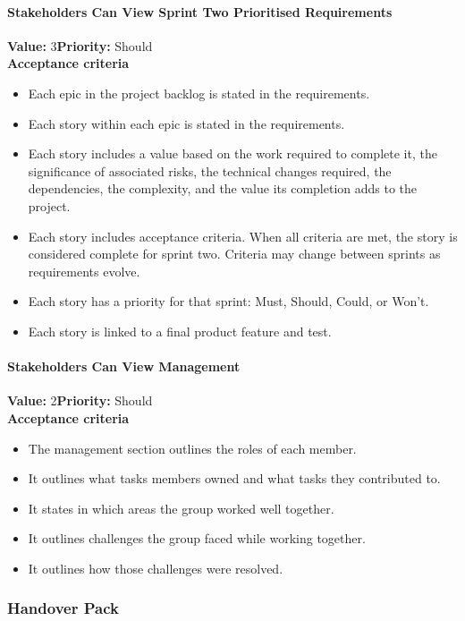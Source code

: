 \paragraph{Stakeholders Can View Sprint Two Prioritised Requirements}
\textbf{Value:} 3\quad \textbf{Priority:} Should\\
\textbf{Acceptance criteria}
\begin{itemize}
  \item Each epic in the project backlog is stated in the requirements.
  \item Each story within each epic is stated in the requirements.
  \item Each story includes a value based on the work required to complete it, the significance of associated risks, the technical changes required, the dependencies, the complexity, and the value its completion adds to the project.
  \item Each story includes acceptance criteria. When all criteria are met, the story is considered complete for sprint two. Criteria may change between sprints as requirements evolve.
  \item Each story has a priority for that sprint: Must, Should, Could, or Won't.
  \item Each story is linked to a final product feature and test.
\end{itemize}

\paragraph{Stakeholders Can View Management}
\textbf{Value:} 2\quad \textbf{Priority:} Should\\
\textbf{Acceptance criteria}
\begin{itemize}
  \item The management section outlines the roles of each member.
  \item It outlines what tasks members owned and what tasks they contributed to.
  \item It states in which areas the group worked well together.
  \item It outlines challenges the group faced while working together.
  \item It outlines how those challenges were resolved.
\end{itemize}

\subsubsection{Handover Pack}

